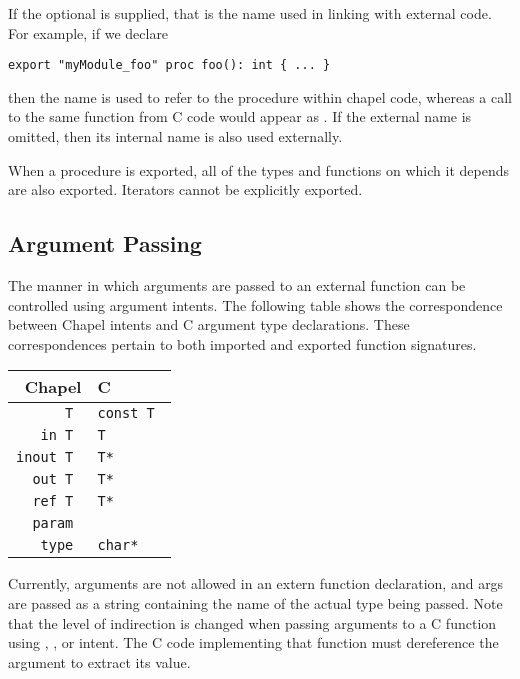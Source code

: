 If the optional  is supplied, that is the name used in
linking with external code.  For example, if we declare
\begin{chapel}
\begin{verbatim}
export "myModule_foo" proc foo(): int { ... }
\end{verbatim}
\end{chapel}
\noindent
then the name  is used to refer to the procedure within chapel code,
whereas a call to the same function from C code would appear
as .  If the external name is omitted, then its internal
name is also used externally.

When a procedure is exported, all of the types and functions on which it depends
are also exported.  Iterators cannot be explicitly exported.

\subsection{Argument Passing}
\label{Interop_Argument_Passing}

The manner in which arguments are passed to an external function can be
controlled using argument intents.  The following table shows the correspondence
between Chapel intents and C argument type declarations.  These correspondences
pertain to both imported and exported function signatures.

\begin{tabular}{rl}
Chapel & C \\
\hline
\tt T & \tt const T \\
\tt in T & \tt T \\
\tt inout T & \tt T* \\
\tt out T & \tt T* \\
\tt ref T & \tt T* \\
\tt param & \tt \\
\tt type & \tt char*\\
\end{tabular}

Currently,  arguments are not allowed in an extern function
declaration, and  args are passed as a string containing the name of
the actual type being passed.  Note that the level of indirection is changed
when passing arguments to a C function using , ,
or  intent.  The C code implementing that function must dereference
the argument to extract its value.
